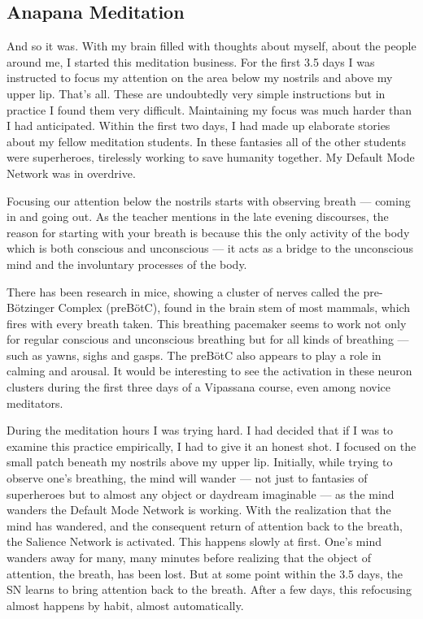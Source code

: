 \documentclass[a4paper, amsfonts, amssymb, amsmath, reprint, showkeys, nofootinbib, twoside]{revtex4-1}
\begin{document}
\subsection{Anapana Meditation}

And so it was. With my brain filled with thoughts about myself, about the people
around me, I started this meditation business. For the first 3.5 days I was instructed
to focus my attention on the area below my nostrils and above my upper
lip. That's all. These are undoubtedly very simple instructions but in practice I
found them very difficult. Maintaining my focus was much harder than I had
anticipated. Within the first two days, I had made up elaborate stories about my
fellow meditation students. In these fantasies all of the other students were
superheroes, tirelessly working to save humanity together. My Default Mode Network
was in overdrive.

Focusing our attention below the nostrils starts with observing breath --- coming in
and going out. As the teacher mentions in the late evening discourses, the reason for
starting with your breath is because this the only activity of the body which is both
conscious and unconscious --- it acts as a bridge to the unconscious mind and the
involuntary processes of the body.

There has been research in mice, showing a cluster of nerves called the
pre-Bötzinger Complex (preBötC), found in the brain stem of most mammals, which fires
with every breath taken. This breathing pacemaker seems to work not only for regular
conscious and unconscious breathing but for all kinds of breathing --- such as yawns,
sighs and gasps. The preBötC also appears to play a role in calming and
arousal. \cite{prebotcgeneration} It would be interesting to see the activation in
these neuron clusters during the first three days of a Vipassana course, even among
novice meditators.

During the meditation hours I was trying hard. I had decided that if I was to examine this practice
empirically, I had to give it an honest shot. I focused on the small patch beneath my
nostrils above my upper lip. Initially, while trying to observe one's breathing, the
mind will wander --- not just to fantasies of superheroes but to almost any object or
daydream imaginable --- as the mind wanders the Default Mode Network is working. With
the realization that the mind has wandered, and the consequent return of attention
back to the breath, the Salience Network is activated.
This happens slowly at first. One's mind wanders away for many, many minutes before
realizing that the object of attention, the breath, has been lost. But
at some point within the 3.5 days, the SN learns to bring attention back to the breath. After a few days, this
refocusing almost happens by habit, almost automatically.
\end{document}
